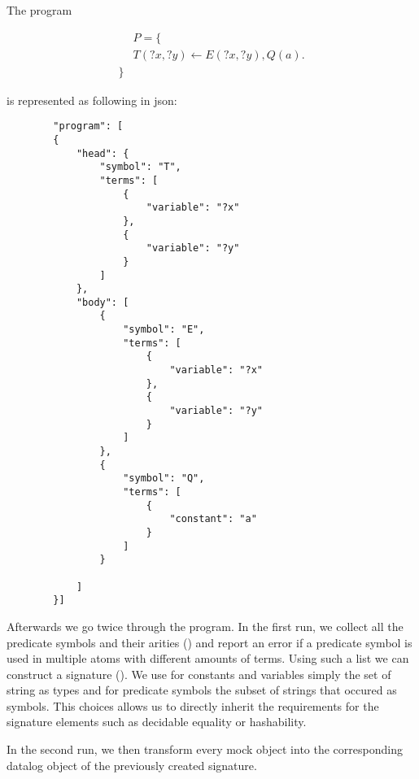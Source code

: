 \begin{example}
    The program 

    \begin{equation}
        \begin{split}
            &P = \{  \\
            &T(?x,?y) \leftarrow E(?x,?y), Q(a).\\
            \}
        \end{split}
    \end{equation}

    is represented as following in json:

    \begin{lstlisting}
        "program": [
        {
            "head": {
                "symbol": "T",
                "terms": [
                    {
                        "variable": "?x"
                    },
                    {
                        "variable": "?y"
                    }
                ]
            },
            "body": [
                {
                    "symbol": "E",
                    "terms": [
                        {
                            "variable": "?x"
                        },
                        {
                            "variable": "?y"
                        }
                    ]
                },
                {
                    "symbol": "Q",
                    "terms": [
                        {
                            "constant": "a"
                        }
                    ]
                }

            ]
        }]
    \end{lstlisting}
\end{example}

Afterwards we go twice through the program. In the first run, we collect all the predicate symbols and their arities (\parsingArityHelper) and report an error if a predicate symbol is used in multiple atoms with different amounts of terms. Using such a list we can construct a signature (\parsingSignature). We use for constants and variables simply the set of string as types and for predicate symbols the subset of strings that occured as symbols. This choices allows us to directly inherit the requirements for the signature elements such as decidable equality or hashability. 

In the second run, we then transform every mock object into the corresponding datalog object of the previously created signature. 

